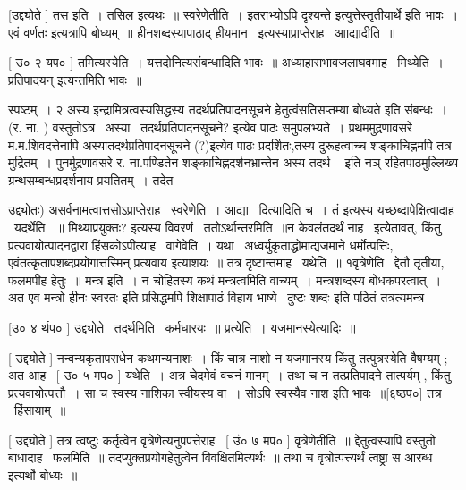 \documentclass[11pt, openany]{book}
\begin{document}
 [उद्द्योते ] तस इति~। तसिल इत्यथः~॥ स्वरेणेतीति~। 
{\qt इतराभ्योऽपि दृश्यन्ते} इत्युत्तेस्तृतीयार्थे इति भावः~। एवं
वर्णतः इत्यत्रापि बोध्यम्~॥ हीनशब्दस्यापाठाद् {\qt हीयमान \textendash\ 
इत्यस्याप्राप्तेराह} \textendash\ आाद्यादीति~॥ 

[ उ० २ यप० ] तमित्यस्येति~। यत्तदोनित्यसंबन्धादिति भावः~॥
अध्याहाराभावजलाघवमाह \textendash\ मिथ्येति~। {\qt प्रतिपादयन्} इत्यन्तमिति भावः~॥ 





स्पष्टम्~। २ अस्य इन्द्रामित्रत्वस्यसिद्धस्य तदर्थप्रतिपादनसूचने
हेतुत्वंसतिसप्तम्या बोध्यते इति संबन्धः~। (र. ना. ) वस्तुतोऽत्र
\textendash\ अस्या \textendash\ तदर्थप्रतिपादनसूचने? इत्येव पाठः समुपलभ्यते~। प्रथममुद्रणावसरे
म.म.शिवदत्तेनापि अस्यातदर्थप्रतिपादनसूचने (?)इत्येव पाठः प्रदर्शितः,तस्य
दुरूहत्वाच्च शङ्काचिह्नमपि तत्र मुद्रितम्~। पुनर्मुद्रणावसरे र.
ना.पण्डितेन शङ्काचिह्नदर्शनभ्रान्तेन {\qt अस्य तदर्थ \textendash\ } इति नञ्
रहितपाठमुल्लिख्य ग्रन्थसम्बन्धप्रदर्शनाय प्रयतितम्~। तदेत \textendash\ 



 उद्द्योतः) असर्वनामत्वात्तसोऽप्राप्तेराह \textendash\ स्वरेणेति~। आद्या \textendash\ 
दित्यादिति च~। {\qt तं} इत्यस्य यच्छब्दापेक्षित्वादाह \textendash\ यदर्थेति ~॥
{\qt मिथ्याप्रयुक्तः?} इत्यस्य विवरणं \textendash\ ततोऽर्थान्तरमिति~॥न केवलंतदर्थं
नाह \textendash\ इत्येतावत्, किंतु प्रत्यवायोत्पादनद्वारा हिंसकोऽपीत्याह \textendash\ 
वागेवेति~। यथा \textendash\ अध्वर्युकृताद्धोमाद्यजमाने धर्मोत्पत्तिः,
एवंतत्कृतापशब्दप्रयोगात्तस्मिन् प्रत्यवाय इत्याशयः~॥ तत्र
दृष्टान्तमाह \textendash\ यथेति~॥ १वृत्रेणेति \textendash\ द्देतौ तृतीया, फलमपीह हेतुः~॥
मन्त्र इति~। न चोहितस्य कथं मन्त्रत्वमिति वाच्यम्~। मन्त्रशब्दस्य
बोधकपरत्वात्~। अत एव {\qt मन्त्रो हीनः स्वरतः} इति प्रसिद्धमपि
शिक्षापाठं विहाय भाष्ये \textendash\ {\qt दुष्टः शब्दः} इति पठितं तत्रत्यमन्त्र



 [उ० ४ र्थप० ] उद्द्योते \textendash\ तदर्थमिति \textendash\ कर्मधारयः~॥ प्रत्येति~। 
यजमानस्येत्यादिः~॥ 

 [ उद्दयोते ] नन्वन्यकृतापराधेन कथमन्यनाशः~। किं चात्र नाशो न
यजमानस्य किंतु तत्पुत्रस्येति वैषम्यम् ; अत आह \textendash\ [ उ० ५ मप० ] यथेति~। 
अत्र चेदमेवं वचनं मानम्~। तथा च न तत्प्रतिपादने तात्पर्यम् , किंतु
प्रत्यवायोत्पत्तौ~। सा च स्वस्य नाशिका स्वीयस्य वा~। सोऽपि स्वस्यैव
नाश इति भावः~॥[६ष्ठप०] तत्र \textendash\ हिंसायाम्~॥ 

 [ उद्द्योते ] तत्र त्वष्टुः कर्तृत्वेन वृत्रेणेत्यनुपपत्तेराह \textendash\ [
उं० ७ मप० ] वृत्रेणेतीति~॥ द्देतुत्वस्यापि वस्तुतो
बाधादाह \textendash\ फलमिति~॥ तदप्युक्तप्रयोगहेतुत्वेन विवक्षितमित्यर्थः~॥ तथा च
वृत्रोत्पत्त्यर्थं त्वष्ट्रा स आरब्ध इत्यर्थो बोध्यः~॥ 
\end{document}
